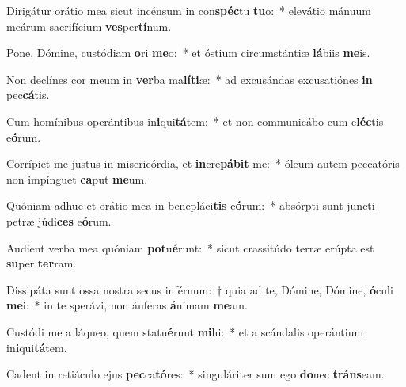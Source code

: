 \item Dirigátur orátio mea sicut incénsum in con\textbf{spéc}tu \textbf{tu}o:~* elevátio mánuum meárum sacrifícium \textbf{ves}per\textbf{tí}num.
\item Pone, Dómine, custódiam \textbf{o}ri \textbf{me}o:~* et óstium circumstántiæ \textbf{lá}biis \textbf{me}is.
\item Non declínes cor meum in \textbf{ver}ba ma\textbf{lí}\textbf{ti}æ:~* ad excusándas excusatiónes \textbf{in} pec\textbf{cá}tis.
\item Cum homínibus operántibus in\textbf{i}qui\textbf{tá}tem:~* et non communicábo cum e\textbf{léc}tis e\textbf{ó}rum.
\item Corrípiet me justus in misericórdia, et \textbf{in}cre\textbf{pá}\textbf{bit} me:~* óleum autem peccatóris non impínguet \textbf{ca}put \textbf{me}um.
\item Quóniam adhuc et orátio mea in benepláci\textbf{tis} e\textbf{ó}rum:~* absórpti sunt juncti petræ júdi\textbf{ces} e\textbf{ó}rum.
\item Audient verba mea quóniam \textbf{pot}u\textbf{é}runt:~* sicut crassitúdo terræ erúpta est \textbf{su}per \textbf{ter}ram.
\item Dissipáta sunt ossa nostra secus inférnum:~† quia ad te, Dómine, Dómine, \textbf{ó}culi \textbf{me}i:~* in te sperávi, non áuferas \textbf{á}nimam \textbf{me}am.
\item Custódi me a láqueo, quem statu\textbf{é}runt \textbf{mi}hi:~* et a scándalis operántium in\textbf{i}qui\textbf{tá}tem.
\item Cadent in retiáculo ejus \textbf{pec}ca\textbf{tó}res:~* singuláriter sum ego \textbf{do}nec \textbf{tráns}eam.
